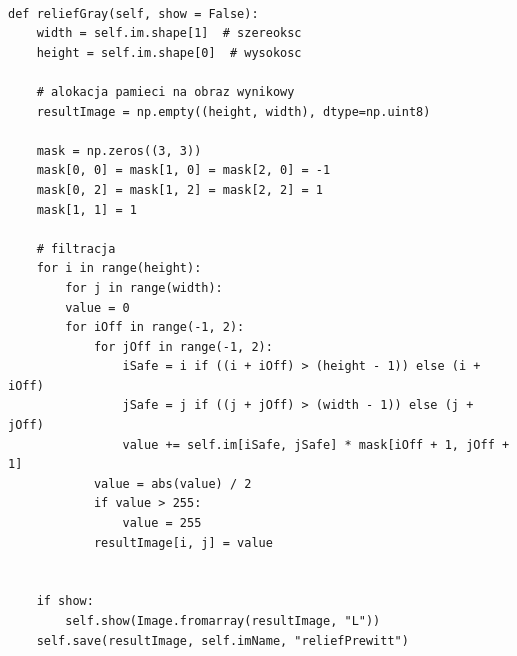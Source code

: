 \documentclass[final,a4paper,openany,12pt]{mwbk}
\begin{document}

\begin{lstlisting}[caption=Filtr płaskorzeźbowy (obraz szary)]
	
def reliefGray(self, show = False):
	width = self.im.shape[1]  # szereoksc
	height = self.im.shape[0]  # wysokosc
	
	# alokacja pamieci na obraz wynikowy
	resultImage = np.empty((height, width), dtype=np.uint8)
	
	mask = np.zeros((3, 3))
	mask[0, 0] = mask[1, 0] = mask[2, 0] = -1
	mask[0, 2] = mask[1, 2] = mask[2, 2] = 1
	mask[1, 1] = 1
	
	# filtracja
	for i in range(height):
		for j in range(width):
		value = 0
		for iOff in range(-1, 2):
			for jOff in range(-1, 2):
				iSafe = i if ((i + iOff) > (height - 1)) else (i + iOff)
				jSafe = j if ((j + jOff) > (width - 1)) else (j + jOff)
				value += self.im[iSafe, jSafe] * mask[iOff + 1, jOff + 1]
			value = abs(value) / 2
			if value > 255:
				value = 255
			resultImage[i, j] = value
	
	
	if show:
		self.show(Image.fromarray(resultImage, "L"))
	self.save(resultImage, self.imName, "reliefPrewitt")
	
\end{lstlisting}

\newpage

\end{document}
